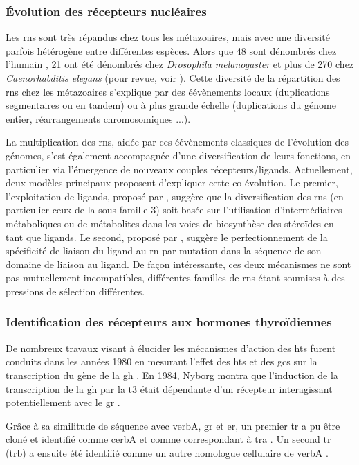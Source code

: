 \documentclass[../main.tex]{subfiles}
\begin{document}
		\subsubsection{Évolution des récepteurs nucléaires}
			Les \glspl{rn} sont très répandus chez tous les métazoaires, mais avec une diversité parfois hétérogène entre différentes espèces.
			Alors que 48 sont dénombrés chez l'humain \citep{Robinson-Rechavi2001}, 21 ont été dénombrés chez \textit{Drosophila melanogaster} et plus de 270 chez \textit{Caenorhabditis elegans} (pour revue, voir \citealp{Robinson-Rechavi2003}).
			Cette diversité de la répartition des \glspl{rn} chez les métazoaires s'explique par des éévènements locaux (duplications segmentaires ou en tandem) ou à plus grande échelle (duplications du génome entier, réarrangements chromosomiques ...).
			\par
			La multiplication des \glspl{rn}, aidée par ces éévènements classiques de l'évolution des génomes, s'est également accompagnée d'une diversification de leurs fonctions, en particulier via l'émergence de nouveaux couples récepteurs/ligands.
			Actuellement, deux modèles principaux proposent d'expliquer cette co-évolution.
			Le premier, l'exploitation de ligands, proposé par \citet{Thornton2001}, suggère que la diversification des \glspl{rn} (en particulier ceux de la sous-famille 3) soit basée sur l'utilisation d'intermédiaires métaboliques ou de métabolites dans les voies de biosynthèse des stéroïdes en tant que ligands.
			Le second, proposé par \citet{Escriva2006}, suggère le perfectionnement de la spécificité de liaison du ligand au \gls{rn} par mutation dans la séquence de son domaine de liaison au ligand.
			De façon intéressante, ces deux mécanismes ne sont pas mutuellement incompatibles, différentes familles de \glspl{rn} étant soumises à des pressions de sélection différentes.

		\subsubsection{Identification des récepteurs aux hormones thyroïdiennes}
			De nombreux travaux visant à élucider les mécanismes d'action des \glspl{ht} furent conduits dans les années 1980 en mesurant l'effet des \glspl{ht} et des \glspl{gc} sur la transcription du gène de la \gls{gh} .
			En 1984, Nyborg montra que l'induction de la transcription de la \gls{gh} par la \gls{t3} était dépendante d'un récepteur interagissant potentiellement avec le \gls{gr} \citep{Nyborg1984}.
			\par
			Grâce à sa similitude de séquence avec \gls{verbA}, \gls{gr} et \gls{er}, un premier \gls{tr} a pu être cloné et identifié comme \gls{cerbA} et comme correspondant à \gls{tra} \citep{Sap1986,Weinberger1986}.
			Un second \gls{tr} (\gls{trb}) a ensuite été identifié comme un autre homologue cellulaire de \gls{verbA} \citep{Thompson1987}.
\end{document}
